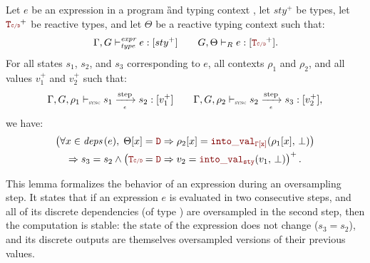 \begin{lemma}
    \label{lem:semantics:grsync:theorems:oversampling:e}
    Let $e$ be an expression in a program \G and typing context \tyCtx, let $sty^+$ be types, let
    $\rType^+$ be reactive types, and let $\Theta$ be a reactive typing context such that:
    \begin{equation*}
        \exprTyped{e}{sty^+} \qquad \exprTypedReact{\Theta}{e}{\rType^+}.
    \end{equation*}
    For all states $s_1$, $s_2$, and $s_3$ corresponding to $e$, all contexts $\rho_1$ and $\rho_2$,
    and all values $v_1^+$ and $v_2^+$ such that:
    \begin{equation*}
        \exprOpsem{\rho_1}{s_1}{e}{s_2}{v_1^+} \qquad \exprOpsem{\rho_2}{s_2}{e}{s_3}{v_2^+},
    \end{equation*}
    we have:
    \begin{multline*}
        \left(\forall x \in \deps{e}, \; \Theta[x] = \dType \Rightarrow \rho_2[x] = \intoVal{\tyCtx[x]}{\rho_1[x]}{\bot}\right) \\
        \Rightarrow
        s_3 = s_2 \wedge \left(\rType = \dType \Rightarrow v_2 = \intoVal{sty}{v_1}{\bot}\right)^+.
    \end{multline*}

    This lemma formalizes the behavior of an expression during an oversampling step.
    It states that if an expression $e$ is evaluated in two consecutive steps, and all of its
    discrete dependencies (of type \dType) are oversampled in the second step, then the
    computation is stable: the state of the expression does not change ($s_3 = s_2$), and
    its discrete outputs are themselves oversampled versions of their previous values.
\end{lemma}
